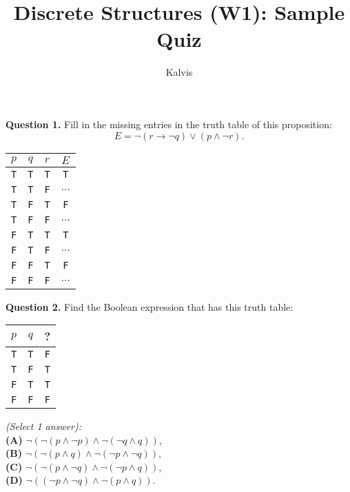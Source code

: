 \documentclass[jou]{apa6}
\title{Discrete Structures (W1): Sample Quiz}
\author{Kalvis}
\affiliation{RBS}
\begin{document}
\maketitle

{\bf Question 1.} Fill in the missing entries in the truth table of this proposition:
$$E = \neg(r \rightarrow \neg q) \vee (p \wedge \neg r).$$

\begin{tabular}{ c | c | c | c }
$p$ & $q$ & $r$ & $E$ \\ \hline
{\tt T} & {\tt T} & {\tt T} & {\tt T} \\ \hline
{\tt T} & {\tt T} & {\tt F} & $\ldots$ \\ \hline
{\tt T} & {\tt F} & {\tt T} & {\tt F} \\ \hline
{\tt T} & {\tt F} & {\tt F} & $\ldots$ \\ \hline
{\tt F} & {\tt T} & {\tt T} & {\tt T} \\ \hline
{\tt F} & {\tt T} & {\tt F} & $\ldots$ \\ \hline
{\tt F} & {\tt F} & {\tt T} & {\tt F} \\ \hline
{\tt F} & {\tt F} & {\tt F} & $\ldots$ \\ \hline
\end{tabular}

\vspace{10pt}
{\bf Question 2.} Find the Boolean expression that has this truth table:

\begin{tabular}{ c | c | c }
$p$ & $q$ & ? \\ \hline
{\tt T} & {\tt T} & {\tt F} \\ \hline
{\tt T} & {\tt F} & {\tt T} \\ \hline
{\tt F} & {\tt T} & {\tt T} \\ \hline
{\tt F} & {\tt F} & {\tt F} \\ \hline
\end{tabular}

\noindent
\vspace{3pt}
{\em (Select 1 answer):}\\
{\bf (A)} $\neg (\neg ( p \wedge \neg p) \wedge \neg (\neg q \wedge q))$,\\
{\bf (B)} $\neg (\neg ( p \wedge q) \wedge \neg (\neg p \wedge \neg q))$,\\
{\bf (C)} $\neg (\neg ( p \wedge \neg q) \wedge \neg (\neg p \wedge q))$,\\
{\bf (D)} $\neg (( \neg p \wedge \neg q) \wedge \neg (p \wedge q))$.
\end{document}
